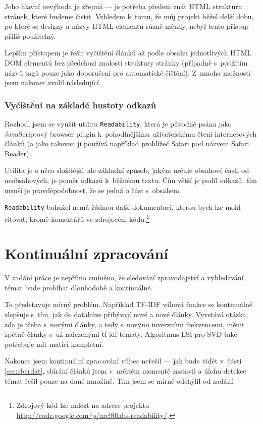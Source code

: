 \documentclass[12pt,a4paper]{report}
\begin{document}
Jeho hlavní nevýhoda je zřejmá --- je potřeba předem znát HTML strukturu stránek, které budeme čistit. Vzhledem k~tomu, že můj projekt běžel delší dobu, po které se designy a názvy HTML elementů různě měnily, nebyl tento přístup příliš použitelný.

Lepším přístupem je řešit vyčištění článků až podle obsahu jednotlivých HTML DOM elementů bez předchozí znalosti struktury stránky (případně s~použitím názvů tagů pouze jako doporučení pro automatické čištění). Z~mnoha možností jsem nakonec zvolil následující.

\subsubsection{Vyčištění na základě hustoty odkazů}
Rozhodl jsem se využít utilitu \texttt{Readability}, která je původně psá\-na ja\-ko Java\-Scri\-pto\-vý brow\-ser plu\-g\-in k~pohodlnějšímu uživatelskému čtení in\-ter\-net\-o\-vých člán\-ků (a jako takovou ji používá například prohlížeč Safari pod názvem Safari Reader). 

Utilita je o něco složitější, ale základní způsob, jakým určuje obsahové části od neobsahových, je poměr odkazů k~běžnému textu. Čím větší je podíl odkazů, tím menší je pravděpodobnost, že se jedná o část s~obsahem. 

\texttt{Readability} bohužel nemá žádnou další dokumentaci, kterou bych lze mohl citovat, kromě komentářů ve zdrojovém kódu.\footnote{Zdrojový kód lze nalézt na adrese projektu \\ \hspace*{1.5em} \url{http://code.google.com/p/arc90labs-readability/}.}


\section{Kontinuální zpracování}
V zadání práce je nepřímo zmíněno, že sledování zpravodajství a vyhledávání témat bude probíhat dlouhodobě a kontinuálně.

To představuje mírný problém. Například TF-IDF váhová funkce se kontinuálně zlepšuje s~tím, jak do databáze přibývají nové a nové články. Vyvstává otázka, zda je třeba s~novými články, a tedy s~novými inverzními frekvencemi, měnit zpětně články s~už nalezenými tf-idf tématy. Algoritmus LSI pro SVD také potřebuje mít matici kompletní.

Nakonec jsem kontinuální zpracování vůbec neřešil --- jak bude vidět v~části \ref{sec:sberdat}, sbírání článků jsem v~určitém momentě zastavil a úlohu detekce témat řešil pouze na dané množině. Tím jsem se mírně odchýlil od zadání.
\end{document}
